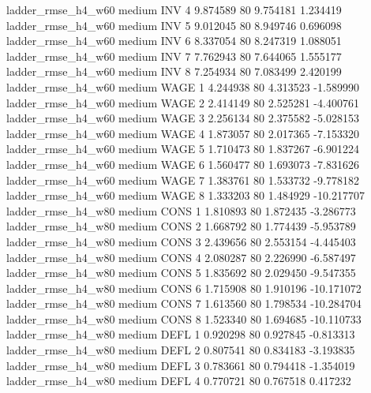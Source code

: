  ladder_rmse_h4_w60     medium      INV                 4  9.874589 80       9.754181           1.234419
 ladder_rmse_h4_w60     medium      INV                 5  9.012045 80       8.949746           0.696098
 ladder_rmse_h4_w60     medium      INV                 6  8.337054 80       8.247319           1.088051
 ladder_rmse_h4_w60     medium      INV                 7  7.762943 80       7.644065           1.555177
 ladder_rmse_h4_w60     medium      INV                 8  7.254934 80       7.083499           2.420199
 ladder_rmse_h4_w60     medium     WAGE                 1  4.244938 80       4.313523          -1.589990
 ladder_rmse_h4_w60     medium     WAGE                 2  2.414149 80       2.525281          -4.400761
 ladder_rmse_h4_w60     medium     WAGE                 3  2.256134 80       2.375582          -5.028153
 ladder_rmse_h4_w60     medium     WAGE                 4  1.873057 80       2.017365          -7.153320
 ladder_rmse_h4_w60     medium     WAGE                 5  1.710473 80       1.837267          -6.901224
 ladder_rmse_h4_w60     medium     WAGE                 6  1.560477 80       1.693073          -7.831626
 ladder_rmse_h4_w60     medium     WAGE                 7  1.383761 80       1.533732          -9.778182
 ladder_rmse_h4_w60     medium     WAGE                 8  1.333203 80       1.484929         -10.217707
 ladder_rmse_h4_w80     medium     CONS                 1  1.810893 80       1.872435          -3.286773
 ladder_rmse_h4_w80     medium     CONS                 2  1.668792 80       1.774439          -5.953789
 ladder_rmse_h4_w80     medium     CONS                 3  2.439656 80       2.553154          -4.445403
 ladder_rmse_h4_w80     medium     CONS                 4  2.080287 80       2.226990          -6.587497
 ladder_rmse_h4_w80     medium     CONS                 5  1.835692 80       2.029450          -9.547355
 ladder_rmse_h4_w80     medium     CONS                 6  1.715908 80       1.910196         -10.171072
 ladder_rmse_h4_w80     medium     CONS                 7  1.613560 80       1.798534         -10.284704
 ladder_rmse_h4_w80     medium     CONS                 8  1.523340 80       1.694685         -10.110733
 ladder_rmse_h4_w80     medium     DEFL                 1  0.920298 80       0.927845          -0.813313
 ladder_rmse_h4_w80     medium     DEFL                 2  0.807541 80       0.834183          -3.193835
 ladder_rmse_h4_w80     medium     DEFL                 3  0.783661 80       0.794418          -1.354019
 ladder_rmse_h4_w80     medium     DEFL                 4  0.770721 80       0.767518           0.417232
